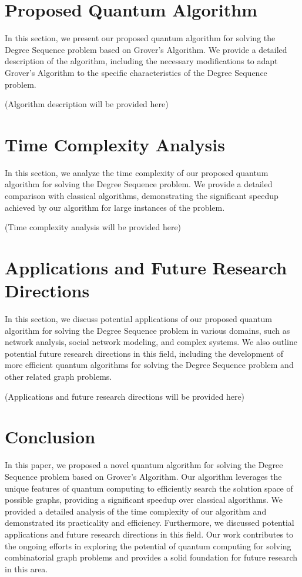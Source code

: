 \section{Proposed Quantum Algorithm}
\label{sec:algorithm}

In this section, we present our proposed quantum algorithm for solving the Degree Sequence problem based on Grover's Algorithm. We provide a detailed description of the algorithm, including the necessary modifications to adapt Grover's Algorithm to the specific characteristics of the Degree Sequence problem.

(Algorithm description will be provided here)

\section{Time Complexity Analysis}
\label{sec:analysis}

In this section, we analyze the time complexity of our proposed quantum algorithm for solving the Degree Sequence problem. We provide a detailed comparison with classical algorithms, demonstrating the significant speedup achieved by our algorithm for large instances of the problem.

(Time complexity analysis will be provided here)

\section{Applications and Future Research Directions}
\label{sec:applications}

In this section, we discuss potential applications of our proposed quantum algorithm for solving the Degree Sequence problem in various domains, such as network analysis, social network modeling, and complex systems. We also outline potential future research directions in this field, including the development of more efficient quantum algorithms for solving the Degree Sequence problem and other related graph problems.

(Applications and future research directions will be provided here)

\section{Conclusion}
\label{sec:conclusion}

In this paper, we proposed a novel quantum algorithm for solving the Degree Sequence problem based on Grover's Algorithm. Our algorithm leverages the unique features of quantum computing to efficiently search the solution space of possible graphs, providing a significant speedup over classical algorithms. We provided a detailed analysis of the time complexity of our algorithm and demonstrated its practicality and efficiency. Furthermore, we discussed potential applications and future research directions in this field. Our work contributes to the ongoing efforts in exploring the potential of quantum computing for solving combinatorial graph problems and provides a solid foundation for future research in this area.


